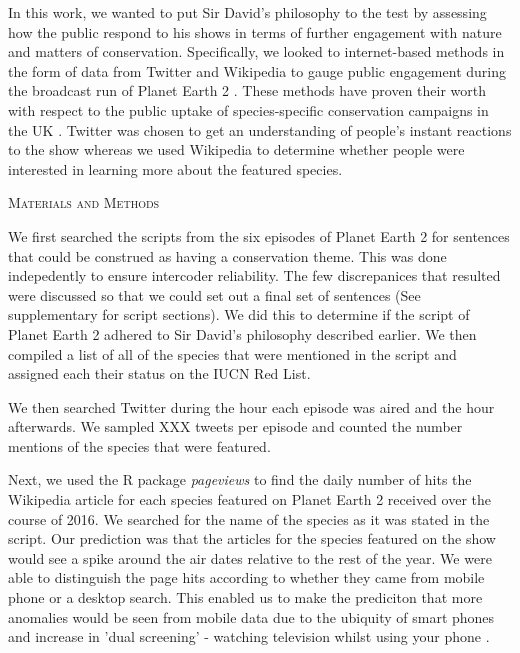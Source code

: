 \documentclass[12pt,letterpaper]{article}
\renewcommand{\section}[1]{%
\bigskip
\begin{center}
\begin{Large}
\normalfont\scshape #1
\medskip
\end{Large}
\end{center}}
\begin{document}
In this work, we wanted to put Sir David's philosophy to the test by assessing how the public respond to his shows in terms of further engagement with nature and matters of conservation. Specifically, we looked to internet-based methods in the form of data from Twitter and Wikipedia to gauge public engagement during the broadcast run of Planet Earth 2 \cite{soriano2017internet}. These methods have proven their worth with respect to the public uptake of species-specific conservation campaigns in the UK \cite{soriano2017internet}. Twitter was chosen to get an understanding of people's instant reactions to the show whereas we used Wikipedia to determine whether people were interested in learning more about the featured species. 





%
%
\section{Materials and Methods}
We first searched the scripts from the six episodes of Planet Earth 2 for sentences that could be construed as having a conservation theme. This was done indepedently to ensure intercoder reliability. The few discrepanices that resulted were discussed so that we could set out a final set of sentences (See supplementary for script sections). We did this to determine if the script of Planet Earth 2 adhered to Sir David's philosophy described earlier. We then compiled a list of all of the species that were mentioned in the script and assigned each their status on the IUCN Red List. 

We then searched Twitter during the hour each episode was aired and the hour afterwards. We sampled XXX tweets per episode and counted the number mentions of the species that were featured. 

Next, we used the R package \textit{pageviews} to find the daily number of hits the Wikipedia article for each species featured on Planet Earth 2 received over the course of 2016. We searched for the name of the species as it was stated in the script. Our prediction was that the articles for the species featured on the show would see a spike around the air dates relative to the rest of the year. We were able to distinguish the page hits according to whether they came from mobile phone or a desktop search. This enabled us to make the prediciton that more anomalies would be seen from mobile data due to the ubiquity of smart phones and increase in 'dual screening' - watching television whilst using your phone \cite{holz2015m}. 
\end{document}
